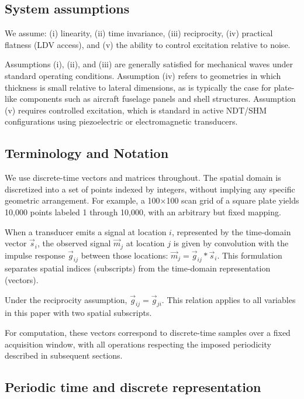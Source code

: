 \documentclass[a4paper,fleqn]{cas-sc}
\begin{document}
\subsection{System assumptions}\label{System assumptions}
We assume: (i) linearity, (ii) time invariance, (iii) reciprocity, (iv) practical flatness (LDV access), and (v) the ability to control excitation relative to noise.

Assumptions (i), (ii), and (iii) are generally satisfied for mechanical waves under standard operating conditions. Assumption (iv) refers to geometries in which thickness is small relative to lateral dimensions, as is typically the case for plate-like components such as aircraft fuselage panels and shell structures. Assumption (v) requires controlled excitation, which is standard in active NDT/SHM configurations using piezoelectric or electromagnetic transducers.

\subsection{Terminology and Notation}
We use discrete-time vectors and matrices throughout. The spatial domain is discretized into a set of points indexed by integers, without implying any specific geometric arrangement. For example, a 100×100 scan grid of a square plate yields 10,000 points labeled 1 through 10,000, with an arbitrary but fixed mapping.

When a transducer emits a signal at location $i$, represented by the time-domain vector $\vec{s}_i$, the observed signal $\vec{m}_j$ at location $j$ is given by convolution with the impulse response $\vec{g}_{ij}$ between those locations: $\vec{m}_j = \vec{g}_{ij} \ast \vec{s}_i$. This formulation separates spatial indices (subscripts) from the time-domain representation (vectors).

Under the reciprocity assumption, $\vec{g}_{ij} = \vec{g}_{ji}$. This relation applies to all variables in this paper with two spatial subscripts.

For computation, these vectors correspond to discrete-time samples over a fixed acquisition window, with all operations respecting the imposed periodicity described in subsequent sections.


\subsection{Periodic time and discrete representation}\label{Periodic time and discrete representation}
\end{document}
